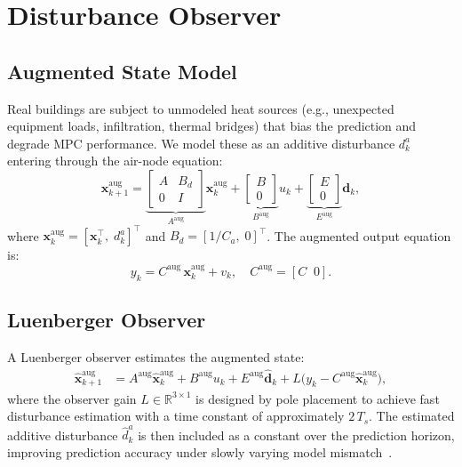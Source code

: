 \documentclass[conference,a4paper]{IEEEtran}[2015/08/26]
\newcommand{\R}{\mathbb{R}}
\newcommand{\vek}[1]{\bm{#1}}
\begin{document}
\section{Disturbance Observer}
\label{sec:observer}

\subsection{Augmented State Model}

Real buildings are subject to unmodeled heat sources (e.g., unexpected
equipment loads, infiltration, thermal bridges) that bias the prediction
and degrade MPC performance. We model these as an additive disturbance
$d_k^a$ entering through the air-node equation:
\begin{equation}
  \vek{x}_{k+1}^{\text{aug}} =
    \underbrace{\begin{bmatrix} A & B_d \\ 0 & I \end{bmatrix}}_{A^{\text{aug}}}
    \vek{x}_k^{\text{aug}} +
    \underbrace{\begin{bmatrix} B \\ 0 \end{bmatrix}}_{B^{\text{aug}}}
    u_k +
    \underbrace{\begin{bmatrix} E \\ 0 \end{bmatrix}}_{E^{\text{aug}}}
    \vek{d}_k,
  \label{eq:aug}
\end{equation}
where $\vek{x}_k^{\text{aug}} = [\vek{x}_k^\top,\; d_k^a]^\top$ and
$B_d = [1/C_a,\; 0]^\top$. The augmented output equation is:
\begin{equation}
  y_k = C^{\text{aug}}\,\vek{x}_k^{\text{aug}} + v_k,
  \quad C^{\text{aug}} = [C \;\; 0].
  \label{eq:aug_out}
\end{equation}

\subsection{Luenberger Observer}

A Luenberger observer estimates the augmented state:
\begin{align}
  \hat{\vek{x}}_{k+1}^{\text{aug}} &=
    A^{\text{aug}}\hat{\vek{x}}_k^{\text{aug}}
    + B^{\text{aug}} u_k
    + E^{\text{aug}} \hat{\vek{d}}_k
    + L\bigl(y_k - C^{\text{aug}}\hat{\vek{x}}_k^{\text{aug}}\bigr),
  \label{eq:observer}
\end{align}
where the observer gain $L \in \R^{3 \times 1}$ is designed by pole
placement to achieve fast disturbance estimation with a time constant
of approximately $2\,T_s$. The estimated additive disturbance
$\hat{d}_k^a$ is then included as a constant over the prediction
horizon, improving prediction accuracy under slowly varying model
mismatch~\cite{Anderson1979,Simon2010}.
\end{document}
